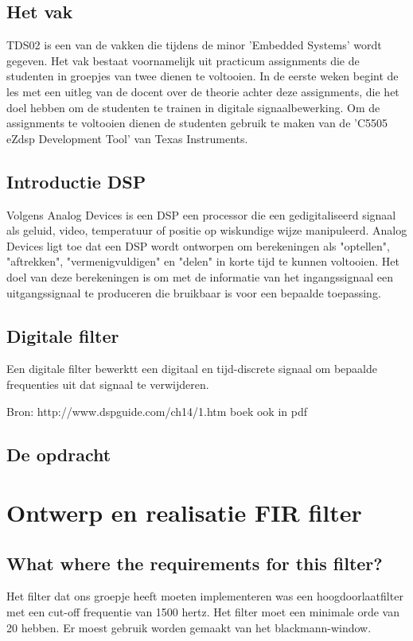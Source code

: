 \documentclass[11pt,a4paper]{article}
\begin{document}
		\subsection{Het vak}
		TDS02 is een van de vakken die tijdens de minor 'Embedded Systems' wordt gegeven. Het vak bestaat voornamelijk uit practicum assignments die de studenten in groepjes van twee dienen te voltooien. In de eerste weken begint de les met een uitleg van de docent over de theorie achter deze assignments, die het doel hebben om de studenten te trainen in digitale signaalbewerking. Om de assignments te voltooien dienen de studenten gebruik te maken van de 'C5505 eZdsp Development Tool' van Texas Instruments.
		
		\subsection{Introductie DSP}
		Volgens Analog Devices \cite{analog} is een DSP een processor die een  	gedigitaliseerd signaal als geluid, video, temperatuur of positie op wiskundige wijze manipuleerd. Analog Devices ligt toe dat een DSP wordt ontworpen om berekeningen als "optellen", "aftrekken", "vermenigvuldigen" en "delen" in korte tijd te kunnen voltooien. Het doel van deze berekeningen is om met de informatie van het ingangssignaal een uitgangssignaal te produceren die bruikbaar is voor een bepaalde toepassing. 
		
		\subsection{Digitale filter}
		Een digitale filter bewerktt een digitaal en tijd-discrete signaal om bepaalde frequenties uit dat signaal te verwijderen.
		
		Bron: http://www.dspguide.com/ch14/1.htm
		boek ook in pdf  			
		
		\subsection{De opdracht}		
		
				
	
	\section{Ontwerp en realisatie FIR filter}
	
	\subsection{What where the requirements for this filter?}
	Het filter dat ons groepje heeft moeten implementeren was een hoogdoorlaatfilter met een cut-off frequentie van 1500 hertz. 
	Het filter moet een minimale orde van 20 hebben. Er moest gebruik worden gemaakt van het blackmann-window.
	
\end{document}

